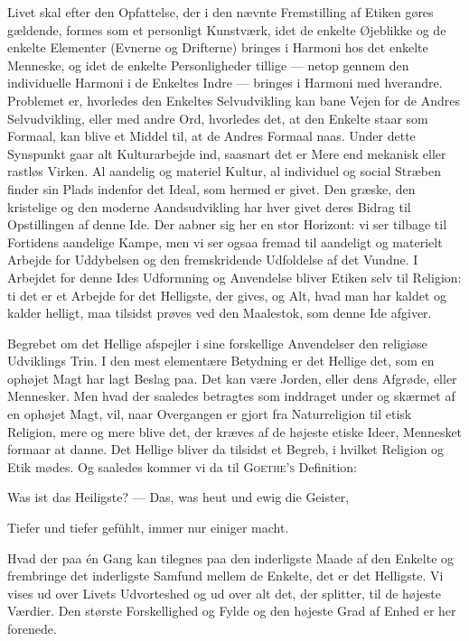 \documentclass[12pt,a4paper,openany]{book}
\newcommand{\opage}[1]{\marginnote{\footnotesize\textit{[#1]}}}
\begin{document}
Livet skal efter den Opfattelse, der i den nævnte Fremstilling af Etiken
gøres gældende, formes som et personligt Kunstværk, idet de enkelte
Øjeblikke og de enkelte Elementer (Evnerne og Drifterne) bringes i
Harmoni hos det enkelte Menneske, og idet de enkelte Personligheder
tillige --- netop gennem den individuelle Harmoni i de Enkeltes Indre
--- bringes i Harmoni med hverandre. Problemet er, hvorledes den
Enkeltes Selvudvikling kan bane Vejen for de Andres Selvudvikling, eller
med andre Ord, hvorledes det, at den Enkelte staar som Formaal,
\opage{239}kan blive et Middel til, at de Andres Formaal naas. Under
dette Synspunkt gaar alt Kulturarbejde ind, saasnart det er Mere end
mekanisk eller rastløs Virken. Al aandelig og materiel Kultur, al
individuel og social Stræben finder sin Plads indenfor det Ideal, som
hermed er givet. Den græske, den kristelige og den moderne
Aandsudvikling har hver givet deres Bidrag til Opstillingen af denne
Ide. Der aabner sig her en stor Horizont: vi ser tilbage til Fortidens
aandelige Kampe, men vi ser ogsaa fremad til aandeligt og materielt
Arbejde for Uddybelsen og den fremskridende Udfoldelse af det Vundne. I
Arbejdet for denne Ides Udformning og Anvendelse bliver Etiken selv til
Religion: ti det er et Arbejde for det Helligste, der gives, og Alt,
hvad man har kaldet og kalder helligt, maa tilsidst prøves ved den
Maalestok, som denne Ide afgiver.

Begrebet om det Hellige afspejler i sine forskellige Anvendelser den
religiøse Udviklings Trin. I den mest elementære Betydning er det
Hellige det, som en ophøjet Magt har lagt Beslag paa. Det kan være
Jorden, eller dens Afgrøde, eller Mennesker. Men hvad der saaledes
betragtes som inddraget under og skærmet af en ophøjet Magt, vil, naar
Overgangen er gjort fra Naturreligion til etisk Religion, mere og mere
blive det, der kræves af de højeste etiske Ideer, Mennesket formaar at
danne. Det Hellige bliver da tilsidst et Begreb, i hvilket Religion og
Etik mødes. Og saaledes kommer vi da til \textsc{Goethe’s} Definition:

Was ist das Heiligste? --- Das, was heut und ewig die Geister,

Tiefer und tiefer gefühlt, immer nur einiger macht.

Hvad der paa én Gang kan tilegnes paa den inderligste Maade af den
Enkelte og frembringe det inderligste Samfund mellem de Enkelte, det er
det Helligste. Vi vises ud over Livets Udvorteshed og ud over alt det,
der splitter, til de højeste Værdier. Den største Forskellighed og Fylde
og den højeste Grad af Enhed er her forenede.
\end{document}
